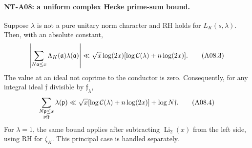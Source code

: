 \paragraph{NT-A08: a uniform complex Hecke prime-sum bound.}
Suppose \(\lambda\) is not a pure unitary norm character and
RH holds for \(L_K(s,\lambda)\). Then, with an absolute constant,
\[
 \left|\sum_{N\mathfrak a\le x}
       \Lambda_K(\mathfrak a)\lambda(\mathfrak a)\right|
 \ll \sqrt x\log(2x)
          [\log{\cal C}(\lambda)+n\log(2x)].             \tag{A08.3}
\]
The value at an ideal not coprime to the conductor is zero.
Consequently, for any integral ideal \(\mathfrak f\) divisible by
\(\mathfrak f_\lambda\),
\[
 \sum_{\substack{N\mathfrak p\le x\\\mathfrak p\nmid\mathfrak f}}
            \lambda(\mathfrak p)
 \ll \sqrt x[\log{\cal C}(\lambda)+n\log(2x)]
                       +\log N\mathfrak f.             \tag{A08.4}
\]
For \(\lambda=1\), the same bound applies after subtracting
\(\operatorname{Li}_2(x)\) from the left side, using RH for
\(\zeta_K\). This principal case is handled separately.


